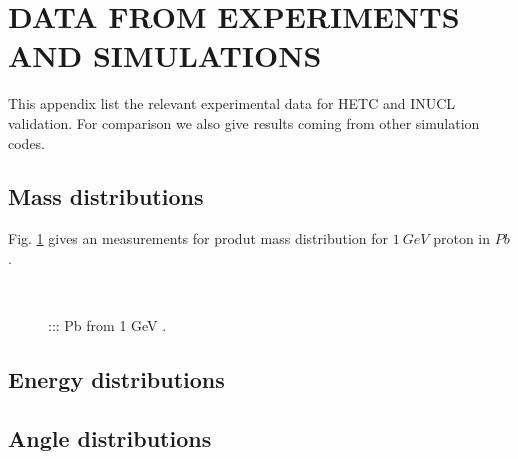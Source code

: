 \section{DATA FROM EXPERIMENTS AND SIMULATIONS}

This appendix list the relevant experimental data for HETC and INUCL validation. 
For comparison we also give results coming from other simulation codes.

\label{manExperiment}

\subsection{Mass distributions} 
\label{experiment:productMass}

Fig. \ref{massPb} gives an measurements for produt mass distribution for $1~GeV $ proton in $Pb$.


\begin{figure}
  \begin{center}
    \leavevmode
    \mbox{\epsfxsize=8cm   }
       \caption{::: Pb from 1 GeV .}
  \label{massPb}
  \end{center}
\end{figure}

\subsection{Energy distributions} 
\subsection{Angle distributions} 